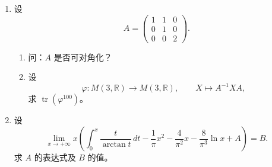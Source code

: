 \begin{enumerate}
    \item 设
    \[
    A=
    \begin{pmatrix}
    1 & 1 & 0\\
    0 & 1 & 0\\
    0 & 0 & 2
    \end{pmatrix}.
    \]
    \begin{enumerate}
        \item 问：$A$ 是否可对角化？
        
        \item 设
        \[
        \varphi:M(3,\mathbb{R})\to M(3,\mathbb{R}),\qquad
        X\mapsto A^{-1}XA,
        \]
        求 $\operatorname{tr}(\varphi^{100})$。
    \end{enumerate}

    \item 设
    \[
    \lim_{x\to+\infty}
    x\left(
    \int_0^x \frac{t}{\arctan t}\,dt
    -\frac{1}{\pi}x^2
    -\frac{4}{\pi^2}x
    -\frac{8}{\pi^3}\ln x
    +A
    \right)=B.
    \]
    求 $A$ 的表达式及 $B$ 的值。
\end{enumerate}